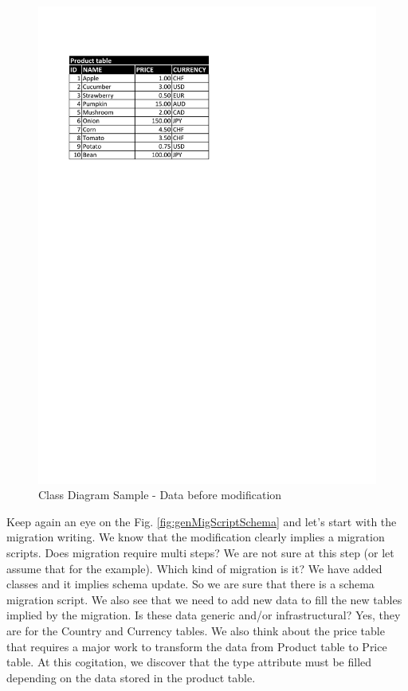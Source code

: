 \begin{figure}[h]
        \centering
        \includegraphics[scale=0.60]{images/ClassDiagramDataBefore.pdf}
        \caption{Class Diagram Sample - Data before modification}
        \label{fig:classDiagDataBefore}
\end{figure}



Keep again an eye on the Fig. \ref{fig:genMigScriptSchema} and let's start with the migration writing. We know that the modification clearly implies a migration scripts. Does migration require multi steps? We are not sure at this step (or let assume that for the example). Which kind of migration is it? We have added classes and it implies schema update. So we are sure that there is a schema migration script. We also see that we need to add new data to fill the new tables implied by the migration. Is these data generic and/or infrastructural? Yes, they are for the Country and Currency tables. We also think about the price table that requires a major work to transform the data from Product table to Price table. At this cogitation, we discover that the type attribute must be filled depending on the data stored in the product table.

